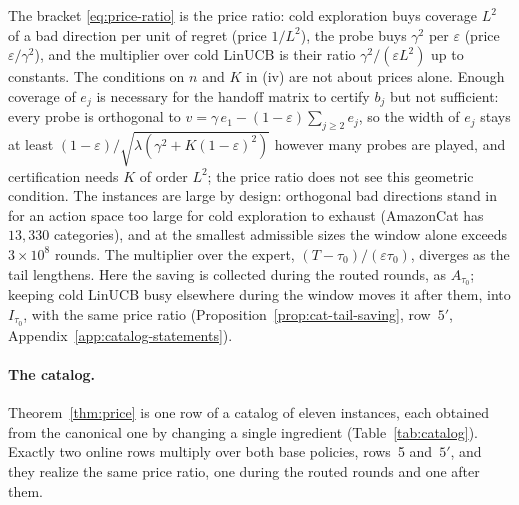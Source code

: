 \documentclass{article}
\theoremstyle{definition}
\theoremstyle{remark}
\newcommand{\eps}{\varepsilon}
\theoremstyle{remark}
\begin{document}
The bracket \eqref{eq:price-ratio} is the price ratio: cold exploration buys
coverage $L^2$ of a bad direction per unit of regret (price $1/L^2$), the
probe buys $\gamma^2$ per $\eps$ (price $\eps/\gamma^2$), and the multiplier over cold
LinUCB is their ratio $\gamma^2/(\eps L^2)$ up to constants. The conditions on
$n$ and $K$ in (iv) are not about prices alone. Enough coverage of $e_j$ is
necessary for the handoff matrix to certify $b_j$ but not sufficient: every
probe is orthogonal to $v=\gamma\,e_1-(1-\eps)\sum_{j\ge2}e_j$, so the width of
$e_j$ stays at least $(1-\eps)/\sqrt{\lambda(\gamma^2+K(1-\eps)^2)}$ however many
probes are played, and certification needs $K$ of order $L^2$; the price
ratio does not see this geometric condition. The instances are large by
design: orthogonal bad directions stand in for an action space too large for
cold exploration to exhaust (AmazonCat has $13{,}330$ categories), and at the
smallest admissible sizes the window alone exceeds $3\times10^8$ rounds. The multiplier over
the expert, $(T-\tau_0)/(\eps\tau_0)$, diverges as the tail lengthens. Here
the saving is collected during the routed rounds, as $A_{\tau_0}$; keeping
cold LinUCB busy elsewhere during the window moves it after them, into
$I_{\tau_0}$, with the same price ratio (Proposition~\ref{prop:cat-tail-saving},
row~$5'$, Appendix~\ref{app:catalog-statements}).

\paragraph{The catalog.}
Theorem~\ref{thm:price} is one row of a catalog of eleven instances, each
obtained from the canonical one by changing a single ingredient
(Table~\ref{tab:catalog}). Exactly two online rows multiply over both base policies,
rows~5 and~$5'$, and they realize the same price ratio, one during the routed
rounds and one after them.
\end{document}
